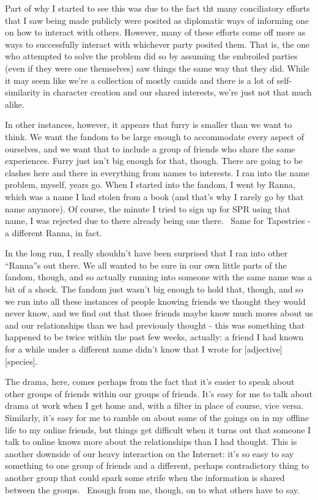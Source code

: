 Part of why I started to see this was due to the fact tht many
conciliatory efforts that I saw being made publicly were posited as
diplomatic ways of informing one on how to interact with others.
However, many of these efforts come off more as ways to successfully
interact with whichever party posited them. That is, the one who
attempted to solve the problem did so by assuming the embroiled parties
(even if they were one themselves) saw things the same way that they
did. While it may seem like we're a collection of mostly canids and
there is a lot of self-similarity in character creation and our shared
interests, we're just not that much alike.

In other instances, however, it appears that furry is smaller than we
want to think. We want the fandom to be large enough to accommodate
every aspect of ourselves, and we want that to include a group of
friends who share the same experiences. Furry just isn't big enough for
that, though. There are going to be clashes here and there in everything
from names to interests. I ran into the name problem, myself, years go.
When I started into the fandom, I went by Ranna, which was a name I had
stolen from a book (and that's why I rarely go by that name anymore). Of
course, the minute I tried to sign up for SPR using that name, I was
rejected due to there already being one there. ~Same for Tapestries - a
different Ranna, in fact.

In the long run, I really shouldn't have been surprised that I ran into
other ``Ranna''s out there. We all wanted to be sure in our own little
parts of the fandom, though, and so actually running into someone with
the same name was a bit of a shock. The fandom just wasn't big enough to
hold that, though, and so we run into all these instances of people
knowing friends we thought they would never know, and we find out that
those friends maybe know much mores about us and our relationships than
we had previously thought - this was something that happened to be twice
within the past few weeks, actually: a friend I had known for a while
under a different name didn't know that I wrote for
{[}adjective{]}{[}species{]}.

The drama, here, comes perhaps from the fact that it's easier to speak
about other groups of friends within our groups of friends. It's easy
for me to talk about drama at work when I get home and, with a filter in
place of course, vice versa. Similarly, it's easy for me to ramble on
about some of the goings on in my offline life to my online friends, but
things get difficult when it turns out that someone I talk to online
knows more about the relationships than I had thought. This is another
downside of our heavy interaction on the Internet: it's so easy to say
something to one group of friends and a different, perhaps contradictory
thing to another group that could spark some strife when the information
is shared between the groups. ~Enough from me, though, on to what others
have to say.


